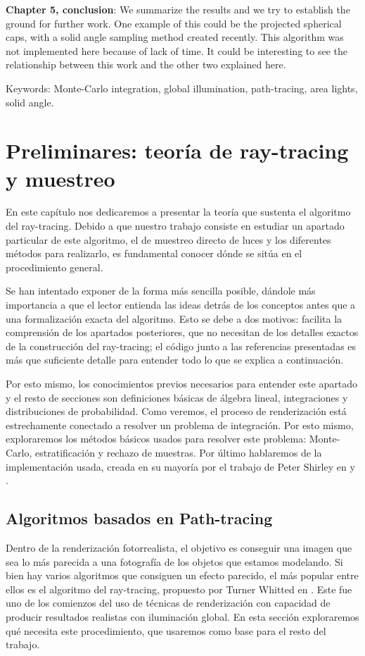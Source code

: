 \documentclass{scrbook}
\begin{document}
\textbf{Chapter 5, conclusion}: We summarize the results and we try to establish the ground for further work. One example of this could be the projected spherical caps, with a solid angle sampling method created recently. This algorithm was not implemented here because of lack of time. It could be interesting to see the relationship between this work and the other two explained here.

Keywords: Monte-Carlo integration, global illumination, path-tracing, area lights, solid angle.


\chapter{Preliminares: teoría de ray-tracing y muestreo}
En este capítulo nos dedicaremos a presentar la teoría que sustenta el algoritmo del ray-tracing. Debido a que nuestro trabajo consiste en estudiar un apartado particular de este algoritmo, el de muestreo directo de luces y los diferentes métodos para realizarlo, es fundamental conocer dónde se sitúa en el procedimiento general.

Se han intentado exponer de la forma más sencilla posible, dándole más importancia a que el lector entienda las ideas detrás de los conceptos antes que a una formalización exacta del algoritmo. Esto se debe a dos motivos: facilita la comprensión de los apartados posteriores, que no necesitan de los detalles exactos de la construcción del ray-tracing; el código junto a las referencias presentadas es más que suficiente detalle para entender todo lo que se explica a continuación. 

Por esto mismo, los conocimientos previos necesarios para entender este apartado y el resto de secciones son definiciones básicas de álgebra lineal, integraciones y distribuciones de probabilidad. Como veremos, el proceso de renderización está estrechamente conectado a  resolver un problema de integración. Por esto mismo, exploraremos los métodos básicos usados para resolver este problema: Monte-Carlo, estratificación y rechazo de muestras. Por último hablaremos de la implementación usada, creada en su mayoría por el trabajo de Peter Shirley en \cite{Weekend} y \cite{NextWeek}.

\section{Algoritmos basados en Path-tracing}
Dentro de la renderización fotorrealista, el objetivo es conseguir una imagen que sea lo más parecida a una fotografía de los objetos que estamos modelando. Si bien hay varios algoritmos que consiguen un efecto parecido, el más popular entre ellos es el algoritmo del ray-tracing, propuesto por Turner Whitted en \cite{Whitted}. Este fue uno de los comienzos  del uso de técnicas de renderización con capacidad de producir resultados realistas con iluminación global. En esta sección exploraremos qué necesita este procedimiento, que usaremos como base para el resto del trabajo.
\end{document}
